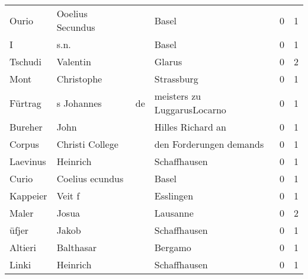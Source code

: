 \begin{center}
\begin{tiny}
\begin{longtabu}{llllrr}
                    Ourio &                   Ooelius Secundus &             &                                       Basel &          0 &         1 \\
                        I &                               s.n. &             &                                       Basel &          0 &         1 \\
                  Tschudi &                           Valentin &             &                                      Glarus &          0 &         2 \\
                     Mont &                         Christophe &             &                                  Strassburg &          0 &         1 \\
                  Fürtrag &                         s Johannes &          de &                 meisters zu LuggarusLocarno &          0 &         1 \\
                  Bureher &                               John &             &                           Hilles Richard an &          0 &         1 \\
                   Corpus &                    Christi College &             &                     den Forderungen demands &          0 &         1 \\
                 Laevinus &                           Heinrich &             &                                Schaffhausen &          0 &         1 \\
                    Curio &                    Coelius ecundus &             &                                       Basel &          0 &         1 \\
                 Kappeier &                             Veit f &             &                                   Esslingen &          0 &         1 \\
                    Maler &                              Josua &             &                                    Lausanne &          0 &         2 \\
                    üfjer &                              Jakob &             &                                Schaffhausen &          0 &         1 \\
                  Altieri &                          Balthasar &             &                                     Bergamo &          0 &         1 \\
                    Linki &                           Heinrich &             &                                Schaffhausen &          0 &         1 \\

\end{longtabu}
\end{tiny}
\end{center}
